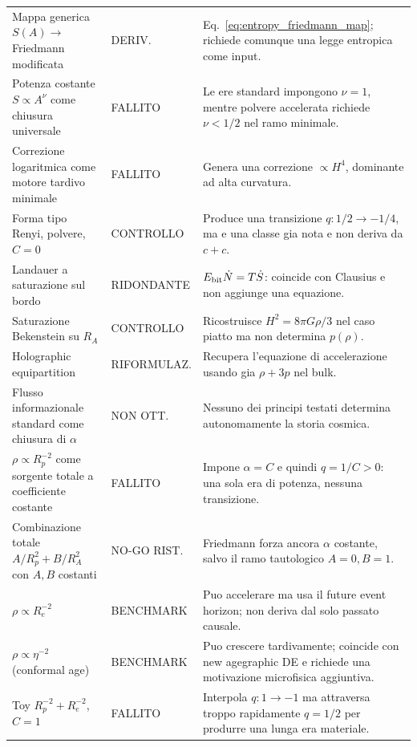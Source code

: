 \documentclass[11pt,a4paper]{article}
\newcommand{\status}[1]{\textsf{#1}}
\begin{document}
\begin{longtable}{p{}p{}p{}}
\addlinespace
Mappa generica $S(A)\to$ Friedmann modificata & \status{DERIV.} & Eq.~\eqref{eq:entropy_friedmann_map}; richiede comunque una legge entropica come input. \\
\addlinespace
Potenza costante $S\propto A^\nu$ come chiusura universale & \status{FALLITO} & Le ere standard impongono $\nu=1$, mentre polvere accelerata richiede $\nu<1/2$ nel ramo minimale. \\
\addlinespace
Correzione logaritmica come motore tardivo minimale & \status{FALLITO} & Genera una correzione $\propto H^4$, dominante ad alta curvatura. \\
\addlinespace
Forma tipo Renyi, polvere, $C=0$ & \status{CONTROLLO} & Produce una transizione $q:1/2\to-1/4$, ma e una classe gia nota e non deriva da $c+c$. \\
\addlinespace
Landauer a saturazione sul bordo & \status{RIDONDANTE} & $E_{\rm bit}\dot N=T\dot S$: coincide con Clausius e non aggiunge una equazione. \\
\addlinespace
Saturazione Bekenstein su $R_A$ & \status{CONTROLLO} & Ricostruisce $H^2=8\pi G\rho/3$ nel caso piatto ma non determina $p(\rho)$. \\
\addlinespace
Holographic equipartition & \status{RIFORMULAZ.} & Recupera l'equazione di accelerazione usando gia $\rho+3p$ nel bulk. \\
\addlinespace
Flusso informazionale standard come chiusura di $\alpha$ & \status{NON OTT.} & Nessuno dei principi testati determina autonomamente la storia cosmica. \\
\addlinespace
$\rho\propto R_p^{-2}$ come sorgente totale a coefficiente costante & \status{FALLITO} & Impone $\alpha=C$ e quindi $q=1/C>0$: una sola era di potenza, nessuna transizione. \\
\addlinespace
Combinazione totale $A/R_p^2+B/R_A^2$ con $A,B$ costanti & \status{NO-GO RIST.} & Friedmann forza ancora $\alpha$ costante, salvo il ramo tautologico $A=0,B=1$. \\
\addlinespace
$\rho\propto R_e^{-2}$ & \status{BENCHMARK} & Puo accelerare ma usa il future event horizon; non deriva dal solo passato causale. \\
\addlinespace
$\rho\propto\eta^{-2}$ (conformal age) & \status{BENCHMARK} & Puo crescere tardivamente; coincide con new agegraphic DE e richiede una motivazione microfisica aggiuntiva. \\
\addlinespace
Toy $R_p^{-2}+R_e^{-2}$, $C=1$ & \status{FALLITO} & Interpola $q:1\to-1$ ma attraversa troppo rapidamente $q=1/2$ per produrre una lunga era materiale. \\

\end{longtable}
\end{document}
